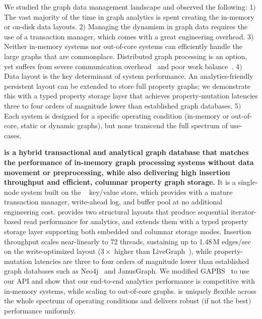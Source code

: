 We studied the graph data management landscape and observed the following:
1$)$ The vast majority of the time in graph analytics is spent creating the in-memory or on-disk data layouts. 
2$)$ Managing the dynamism in graph data requires the use of a transaction manager, which comes with a great engineering overhead.
3$)$ Neither in-memory systems nor out-of-core systems can efficiently handle the large graphs that are commonplace. Distributed graph processing is an option, yet suffers from severe communication overhead~\cite{mcsherry2015scalability,beamer2016understanding} and poor work balance~\cite{hajidehi2023cuttana}.
4$)$ Data layout is the key determinant of system performance. An analytics-friendly persistent layout can be extended to store full property graphs; we demonstrate this with a typed property storage layer that achieves property-mutation latencies three to four orders of magnitude lower than established graph databases.
5$)$ Each system is designed for a specific operating condition (in-memory or out-of-core, static or dynamic graphs), but none transcend the full spectrum of use-cases.

\textbf{\project{} is a hybrid transactional and analytical graph database that matches the performance of in-memory graph processing systems without data movement or preprocessing, while also delivering high insertion throughput and efficient, columnar property graph storage.}
It is a single-node system built on the \wt{}~\cite{WiredTigerDocumentation} key/value store, which provides \project{} with a mature transaction manager, write-ahead log, and buffer pool at no additional engineering cost.
\project{} provides two structural layouts that produce sequential iterator-based read performance for analytics, and extends them with a typed property storage layer supporting both embedded and columnar storage modes.
Insertion throughput scales near-linearly to 72 threads, sustaining up to 1.48\,M edges/sec on the write-optimized layout ($3\times$ higher than LiveGraph~\cite{zhu2019livegraph}), while property-mutation latencies are three to four orders of magnitude lower than established graph databases such as Neo4j~\cite{neo4j} and JanusGraph\cite{janusgraph}.
We modified GAPBS~\cite{beamer2015gap} to use our API and show that our end-to-end analytics performance is competitive with in-memory systems, while scaling to out-of-core graphs.
\project{} is uniquely flexible across the whole spectrum of operating conditions  and delivers robust $($if not the best$)$ performance uniformly.

